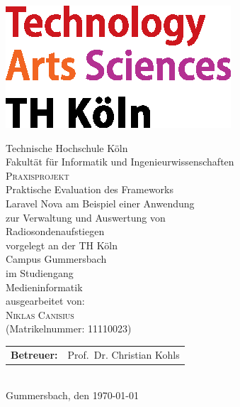 \pagestyle{empty}
\begin{titlepage}
    \includegraphics[scale=1.0]{images/logo_TH-Koeln_CMYK_22pt}\\
    \begin{center}
        \large
        Technische Hochschule Köln\\
        Fakultät für Informatik und Ingenieurwissenschaften\\
        \vspace{1cm}
        \large
        \textsc{Praxisprojekt}\\
        \vspace{1cm}
        \huge
        Praktische Evaluation des Frameworks\\
        Laravel Nova am Beispiel einer Anwendung\\
        zur Verwaltung und Auswertung von\\
        Radiosondenaufstiegen\\
        \vspace{1cm}
        \large
        vorgelegt an der TH Köln\\
        Campus Gummersbach\\
        im Studiengang\\
        Medieninformatik\\
        \vspace{1cm}
        ausgearbeitet von:\\
        \textsc{Niklas Canisius}\\
        (Matrikelnummer: 11110023)\\
        \vspace{1cm}
        \begin{tabular}{ll}
            \textbf{Betreuer:} & Prof.\ Dr. Christian Kohls \\
        \end{tabular}
        \vspace{1cm}
        \\Gummersbach, den \today
    \end{center}
\end{titlepage}
